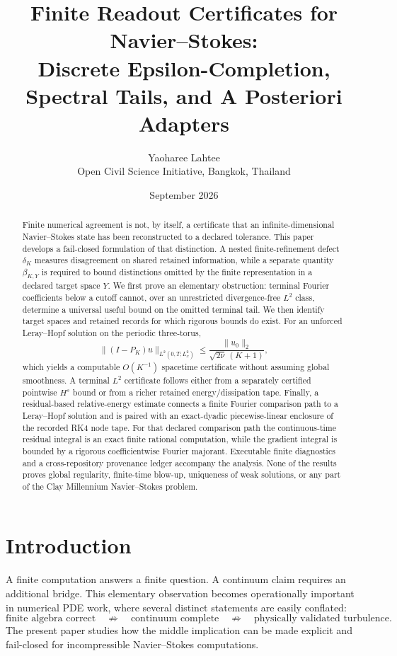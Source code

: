 \documentclass[11pt]{article}
\title{Finite Readout Certificates for Navier--Stokes:\\
Discrete Epsilon-Completion, Spectral Tails, and A Posteriori Adapters}
\author{Yaoharee Lahtee\\
\small Open Civil Science Initiative, Bangkok, Thailand}
\date{September 2026}
\theoremstyle{definition}
\begin{document}
\maketitle

\begin{abstract}
Finite numerical agreement is not, by itself, a certificate that an infinite-dimensional
Navier--Stokes state has been reconstructed to a declared tolerance.  This paper develops a
fail-closed formulation of that distinction.  A nested finite-refinement defect
$\delta_K$ measures disagreement on shared retained information, while a separate quantity
$\beta_{K,Y}$ is required to bound distinctions omitted by the finite representation in a
declared target space $Y$.  We first prove an elementary obstruction: terminal Fourier
coefficients below a cutoff cannot, over an unrestricted divergence-free $L^2$ class, determine a
universal useful bound on the omitted terminal tail.  We then identify target spaces and retained
records for which rigorous bounds do exist.  For an unforced Leray--Hopf solution on the periodic
three-torus,
\[
\|(I-P_K)u\|_{L^2(0,T;L^2_x)}
\le \frac{\|u_0\|_2}{\sqrt{2\nu}\,(K+1)},
\]
which yields a computable $O(K^{-1})$ spacetime certificate without assuming global smoothness.
A terminal $L^2$ certificate follows either from a separately certified pointwise $H^s$ bound or
from a richer retained energy/dissipation tape.  Finally, a residual-based relative-energy
estimate connects a finite Fourier comparison path to a Leray--Hopf solution and is paired with
an exact-dyadic piecewise-linear enclosure of the recorded RK4 node tape.  For that declared
comparison path the continuous-time residual integral is an exact finite rational computation,
while the gradient integral is bounded by a rigorous coefficientwise Fourier majorant.  Executable
finite diagnostics and a cross-repository provenance ledger accompany the analysis.  None of the
results proves global regularity, finite-time blow-up, uniqueness of weak solutions, or any part of
the Clay Millennium Navier--Stokes problem.
\end{abstract}

\section{Introduction}

A finite computation answers a finite question.  A continuum claim requires an additional bridge.
This elementary observation becomes operationally important in numerical PDE work, where several
distinct statements are easily conflated:
\[
\text{finite algebra correct}
\quad\not\Rightarrow\quad
\text{continuum complete}
\quad\not\Rightarrow\quad
\text{physically validated turbulence}.
\]
The present paper studies how the middle implication can be made explicit and fail-closed for
incompressible Navier--Stokes computations.
\end{document}
